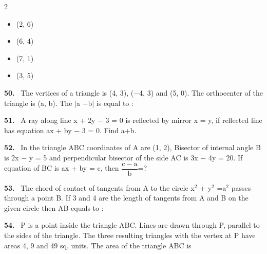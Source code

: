 \documentclass[10pt]{extarticle}
\newcommand{\qn}[1]{\par\smallskip\noindent\textbf{#1.}~}
\newenvironment{qoptions}{\begin{itemize}[leftmargin=1.8em,itemsep=1pt,topsep=2pt,label={}]}{\end{itemize}}
\newcommand{\opt}[2]{\item[(#1)] #2}
\begin{document}
\begin{multicols}{2}
\begin{qoptions}
\opt{A}{(2, 6)}
\opt{B}{(6, 4)}
\opt{C}{(7, 1)}
\opt{D}{(3, 5)}
\end{qoptions}
\qn{50} The vertices of a triangle is (4, 3), ($-$4, 3) and (5, 0). The orthocenter of the triangle is (a, b). The $|$a $-$b$|$ is equal to :
\qn{51} A ray along line x + 2y $-$ 3 = 0 is reflected by mirror x = y, if reflected line has equation ax + by $-$ 3 = 0. Find a+b.
\qn{52} In the triangle ABC coordinates of A are (1, 2), Bisector of internal angle B is 2x $-$ y = 5 and perpendicular bisector of the side AC is 3x $-$ 4y = 20. If equation of BC is ax + by = c, then $\dfrac{\mathrm c-\mathrm a}{\mathrm b}$=?
\qn{53} The chord of contact of tangents from A to the circle x$^2$ + y$^2$ =a$^2$ passes through a point B. If 3 and 4 are the length of tangents from A and B on the given circle then AB equals to :
\qn{54} P is a point inside the triangle ABC. Lines are drawn through P, parallel to the sides of the triangle. The three resulting triangles with the vertex at P have areas 4, 9 and 49 sq. units. The area of the triangle ABC is
\end{multicols}
\end{document}
